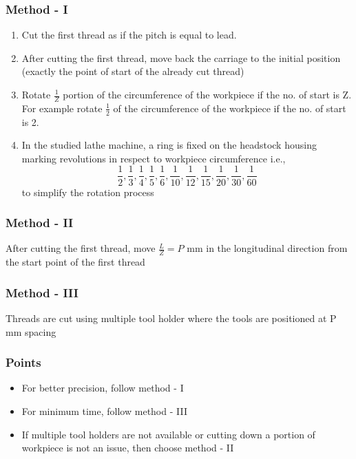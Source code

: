 \documentclass{article}
\begin{document}
\subsubsection*{Method - I}
\begin{enumerate}
  \item  Cut the first thread as if the pitch is equal to lead.
  \item After cutting the first thread, move back the carriage to the initial position (exactly the point of start of the already cut thread)
  \item Rotate $\frac{1}{Z}$ portion of the circumference of the workpiece if the no. of start is Z. For example rotate $\frac{1}{2}$ of the circumference of the workpiece if the no. of start is 2.
  \item In the studied lathe machine, a ring is fixed on the headstock housing marking 
  revolutions in respect to workpiece circumference i.e.,$$\frac{1}{2}, \frac{1}{3}, \frac{1}{4}, \frac{1}{5}, \frac{1}{6}, \frac{1}{10}, \frac{1}{12}, \frac{1}{15}, \frac{1}{20}, \frac{1}{30}, \frac{1}{60}$$
  to simplify the rotation process
  
\end{enumerate}

\subsubsection*{Method - II}
After cutting the first thread, move $\frac{L}{Z} = P$ mm in the 
longitudinal direction from the start point of the first thread



\subsubsection*{Method - III}
Threads are cut using multiple tool holder where the tools 
are positioned at P mm spacing

\subsubsection*{Points}
\begin{itemize}
  \item For better precision, follow method - I 
  \item For minimum time, follow method - III 
  \item If multiple tool holders are not available or cutting down a portion of workpiece is not an issue, then choose method - II 
\end{itemize}
\end{document}
